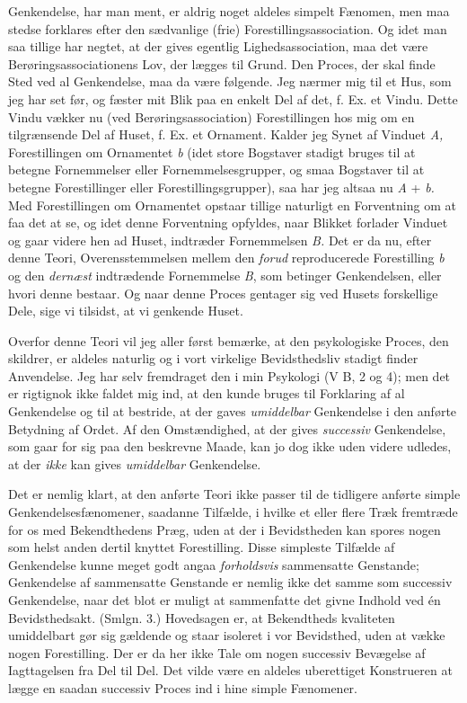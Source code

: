 \documentclass[12pt,a4paper,openany]{book}
\newcommand{\opage}[1]{\marginnote{\footnotesize\textit{[#1]}}}
\begin{document}
Genkendelse, har man ment, er aldrig noget aldeles simpelt Fænomen, men maa
stedse forklares efter den sædvanlige (frie) Forestillingsassociation. Og idet
man saa tillige har negtet, at der gives egentlig Lighedsassociation, maa det
være Berøringsassociationens Lov, der lægges til Grund. Den Proces, der skal
finde Sted ved al Genkendelse, maa da være følgende. Jeg nærmer mig til et Hus,
som jeg har set før, og fæster mit Blik paa en enkelt Del af det, f. Ex. et
Vindu. Dette Vindu vækker nu (ved Berøringsassociation) Forestillingen hos mig
om en tilgrænsende Del af Huset, f. Ex. et Ornament. Kalder jeg Synet af
Vinduet \textit{A,} Forestillingen om Ornamentet \textit{b} (idet store
Bogstaver stadigt bruges til at betegne Fornemmelser eller Fornemmelsesgrupper,
og smaa Bogstaver til at betegne Forestillinger eller Forestillingsgrupper),
saa har jeg altsaa nu \textit{A} + \textit{b.} Med Forestillingen om Ornamentet
opstaar tillige naturligt en Forventning om at faa det at se, og idet denne
Forventning opfyldes, naar Blikket forlader Vinduet og gaar videre hen ad
Huset, indtræder Fornemmelsen \textit{B.} Det er da nu, efter denne Teori,
Overensstemmelsen mellem den \emph{forud} reproducerede Forestilling \textit{b}
og den \emph{dernæst} indtrædende Fornemmelse \textit{B}, som betinger
Genkendelsen, eller hvori denne bestaar. Og naar denne Proces gentager sig ved
Husets forskellige Dele, sige vi tilsidst, at vi genkende Huset.

Overfor denne Teori vil jeg aller først bemærke, at den psykologiske Proces,
den skildrer, er aldeles naturlig og i vort virkelige Bevidsthedsliv stadigt
finder Anvendelse. Jeg har selv fremdraget den i min Psykologi (V B, 2 og 4);
men det er rigtignok ikke faldet mig ind, at den kunde bruges til Forklaring af
al Genkendelse og til at bestride, at der gaves \emph{umiddelbar} Genkendelse i
den anførte Betydning af Ordet. Af den Omstændighed, at der gives
\emph{successiv} Genkendelse, som gaar for sig paa den beskrevne Maade, kan jo
dog ikke uden videre udledes, at der \emph{ikke} kan gives \emph{umiddelbar}
Genkendelse.

Det er nemlig klart, at den anførte Teori ikke passer til de tidligere anførte
simple Genkendelsesfænomener, saadanne Tilfælde, i hvilke et eller flere Træk
fremtræde for os med Bekendthedens Præg, uden at der i Bevidstheden kan spores
nogen som helst anden dertil knyttet Forestilling. Disse simpleste Tilfælde af
Genkendelse kunne meget godt angaa \emph{forholdsvis} sammensatte Genstande;
Genkendelse af sammensatte Genstande er nemlig ikke det samme som successiv
Genkendelse, naar det blot er muligt at sammenfatte det givne Indhold ved én
Bevidsthedsakt. (Smlgn. 3.) Hovedsagen er, at Bekendtheds%
\setcounter{footnote}{0}%
\opage{19}kvaliteten umiddelbart gør sig gældende og staar isoleret i vor
Bevidsthed, uden at vække nogen Forestilling. Der er da her ikke Tale om nogen
successiv Bevægelse af Iagttagelsen fra Del til Del. Det vilde være en aldeles
uberettiget Konstrueren at lægge en saadan successiv Proces ind i hine simple
Fænomener.
\end{document}
